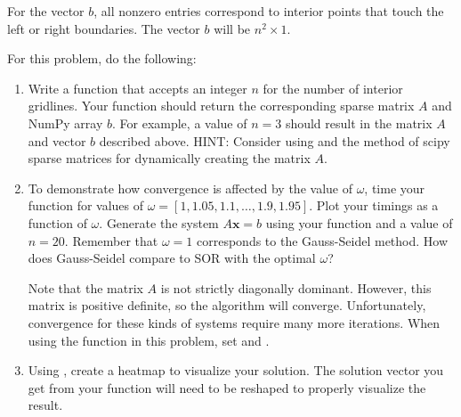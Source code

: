 \begin{problem}
For the vector $b$, all nonzero entries correspond to interior points that touch the left or right boundaries. The vector $b$ will be $n^2 \times 1$.

For this problem, do the following:
\begin{enumerate}
    \item Write a function  that accepts an integer $n$ for the number of interior gridlines. Your function should return the corresponding sparse matrix $A$ and NumPy array $b$. For example, a value of $n = 3$ should result in the matrix $A$ and vector $b$ described above. HINT: Consider using  and the  method of scipy sparse matrices for dynamically creating the matrix $A$.
    \item To demonstrate how convergence is affected by the value of $\omega$, time your  function for values of $\omega = [1, 1.05, 1.1, \dots , 1.9, 1.95 ]$. Plot your timings as a function of $\omega$. Generate the system $A \mathbf{x} = b$ using your  function and a value of $n = 20$. Remember that $\omega = 1$ corresponds to the Gauss-Seidel method. How does Gauss-Seidel compare to SOR with the optimal $\omega$?

    Note that the matrix $A$ is not strictly diagonally dominant. However, this matrix is positive definite, so the algorithm will converge. Unfortunately, convergence for these kinds of systems require many more iterations. When using the  function in this problem, set  and .
    \item Using , create a heatmap to visualize your solution. The solution vector you get from your  function will need to be reshaped to properly visualize the result.
\end{enumerate}

 \label{prob:application}
\end{problem}

